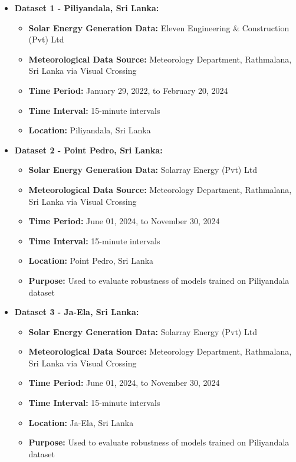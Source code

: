 \documentclass[12pt]{uomthesis}
\begin{document}
\begin{itemize}
    \item \textbf{Dataset 1 - Piliyandala, Sri Lanka:}
    \begin{itemize}
        \item \textbf{Solar Energy Generation Data:} Eleven Engineering \& Construction (Pvt) Ltd
        \item \textbf{Meteorological Data Source:} Meteorology Department, Rathmalana, Sri Lanka via Visual Crossing
        \item \textbf{Time Period:} January 29, 2022, to February 20, 2024
        \item \textbf{Time Interval:} 15-minute intervals
        \item \textbf{Location:} Piliyandala, Sri Lanka
    \end{itemize}

    \item \textbf{Dataset 2 - Point Pedro, Sri Lanka:}
    \begin{itemize}
        \item \textbf{Solar Energy Generation Data:} Solarray Energy (Pvt) Ltd
        \item \textbf{Meteorological Data Source:} Meteorology Department, Rathmalana, Sri Lanka via Visual Crossing
        \item \textbf{Time Period:} June 01, 2024, to November 30, 2024
        \item \textbf{Time Interval:} 15-minute intervals
        \item \textbf{Location:} Point Pedro, Sri Lanka
        \item \textbf{Purpose:} Used to evaluate robustness of models trained on Piliyandala dataset
    \end{itemize}

    \item \textbf{Dataset 3 - Ja-Ela, Sri Lanka:}
    \begin{itemize}
        \item \textbf{Solar Energy Generation Data:} Solarray Energy (Pvt) Ltd
        \item \textbf{Meteorological Data Source:} Meteorology Department, Rathmalana, Sri Lanka via Visual Crossing
        \item \textbf{Time Period:} June 01, 2024, to November 30, 2024
        \item \textbf{Time Interval:} 15-minute intervals
        \item \textbf{Location:} Ja-Ela, Sri Lanka
        \item \textbf{Purpose:} Used to evaluate robustness of models trained on Piliyandala dataset
    \end{itemize}
\end{itemize}
\end{document}
